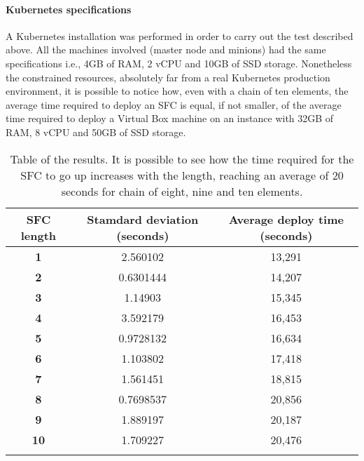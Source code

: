 \paragraph*{Kubernetes specifications}
A Kubernetes installation was performed in order to carry out the test
described above. All the machines involved (master node and minions) had the
same specifications i.e., 4GB of RAM, 2 vCPU and 10GB of SSD storage.
Nonetheless the constrained resources, absolutely far from a real Kubernetes
production environment, it is possible to notice how, even with a chain of ten
elements, the average time required to deploy an SFC is equal, if not smaller,
of the average time required to deploy a Virtual Box machine on an instance 
with 32GB of RAM, 8 vCPU and 50GB of SSD storage.

\begin{longtable}[c]{c|c|c}
\textbf{SFC length} & \textbf{Stamdard deviation (seconds)} & \textbf{Average 
deploy time (seconds)} \\ \hline
\endhead
%
\textbf{1}          & 2.560102                   & 13,291                     \\
\textbf{2}          & 0.6301444                  & 14,207                     \\
\textbf{3}          & 1.14903                    & 15,345                     \\
\textbf{4}          & 3.592179                   & 16,453                     \\
\textbf{5}          & 0.9728132                  & 16,634                     \\
\textbf{6}          & 1.103802                   & 17,418                     \\
\textbf{7}          & 1.561451                   & 18,815                     \\
\textbf{8}          & 0.7698537                  & 20,856                     \\
\textbf{9}          & 1.889197                   & 20,187                     \\
\textbf{10}         & 1.709227                   & 20,476                     \\
\caption[SFC start up time]{Table of the results. It is possible to see how the
  time required for the SFC to go up increases with the length, reaching an
  average of 20 seconds for chain of eight, nine and ten elements.}
\label{chap:tests:sec:sfclength:tab:sfcdata}\\
\end{longtable}


